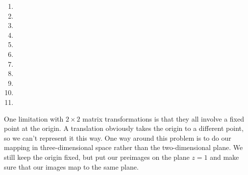 \documentclass[../gatm.tex]{subfiles}
\begin{document}
\begin{enumerate}
\begin{multicols}{4}
\begin{enumerate}
\item {}
\item {}
\item {}
\item {}
\item {}
\item {}
\item {}
\item {}
\item {}
\item {}
\item {}
\end{enumerate}
\end{multicols}
\setcounter{mp_problem_i}{\value{enumi}}
\end{enumerate}

One limitation with $2\times 2$ matrix transformations is that they all involve a fixed point at the origin. A translation obviously takes the origin to a different point, so we can't represent it this way. One way around this problem is to do our mapping in three-dimensional space rather than the two-dimensional plane. We still keep the origin fixed, but put our preimages on the plane $z=1$ and make sure that our images map to the same plane.
\end{document}
